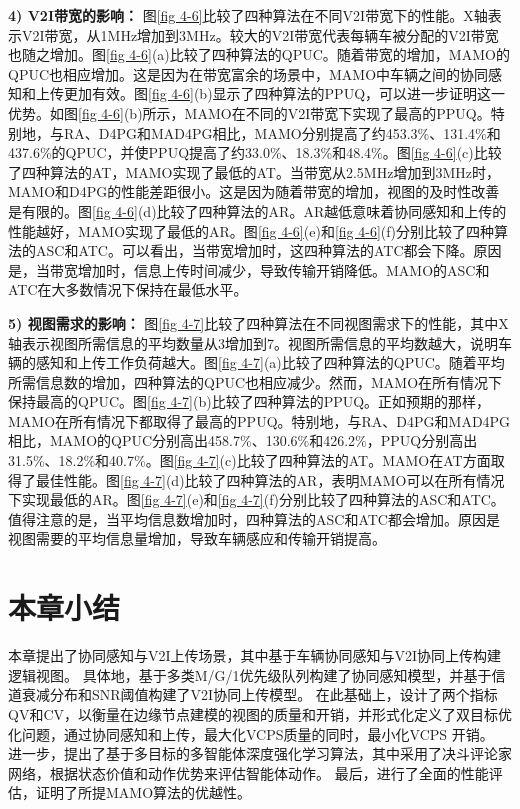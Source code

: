 \textbf{4) V2I带宽的影响：}
图\ref{fig 4-6}比较了四种算法在不同V2I带宽下的性能。X轴表示V2I带宽，从1MHz增加到3MHz。较大的V2I带宽代表每辆车被分配的V2I带宽也随之增加。图\ref{fig 4-6}(a)比较了四种算法的QPUC。随着带宽的增加，MAMO的QPUC也相应增加。这是因为在带宽富余的场景中，MAMO中车辆之间的协同感知和上传更加有效。图\ref{fig 4-6}(b)显示了四种算法的PPUQ，可以进一步证明这一优势。如图\ref{fig 4-6}(b)所示，MAMO在不同的V2I带宽下实现了最高的PPUQ。特别地，与RA、D4PG和MAD4PG相比，MAMO分别提高了约453.3\%、131.4\%和437.6\%的QPUC，并使PPUQ提高了约33.0\%、18.3\%和48.4\%。图\ref{fig 4-6}(c)比较了四种算法的AT，MAMO实现了最低的AT。当带宽从2.5MHz增加到3MHz时，MAMO和D4PG的性能差距很小。这是因为随着带宽的增加，视图的及时性改善是有限的。图\ref{fig 4-6}(d)比较了四种算法的AR。AR越低意味着协同感知和上传的性能越好，MAMO实现了最低的AR。图\ref{fig 4-6}(e)和\ref{fig 4-6}(f)分别比较了四种算法的ASC和ATC。可以看出，当带宽增加时，这四种算法的ATC都会下降。原因是，当带宽增加时，信息上传时间减少，导致传输开销降低。MAMO的ASC和ATC在大多数情况下保持在最低水平。

\textbf{5) 视图需求的影响：}
图\ref{fig 4-7}比较了四种算法在不同视图需求下的性能，其中X轴表示视图所需信息的平均数量从3增加到7。视图所需信息的平均数越大，说明车辆的感知和上传工作负荷越大。图\ref{fig 4-7}(a)比较了四种算法的QPUC。随着平均所需信息数的增加，四种算法的QPUC也相应减少。然而，MAMO在所有情况下保持最高的QPUC。图\ref{fig 4-7}(b)比较了四种算法的PPUQ。正如预期的那样，MAMO在所有情况下都取得了最高的PPUQ。特别地，与RA、D4PG和MAD4PG相比，MAMO的QPUC分别高出458.7\%、130.6\%和426.2\%，PPUQ分别高出31.5\%、18.2\%和40.7\%。图\ref{fig 4-7}(c)比较了四种算法的AT。MAMO在AT方面取得了最佳性能。图\ref{fig 4-7}(d)比较了四种算法的AR，表明MAMO可以在所有情况下实现最低的AR。图\ref{fig 4-7}(e)和\ref{fig 4-7}(f)分别比较了四种算法的ASC和ATC。值得注意的是，当平均信息数增加时，四种算法的ASC和ATC都会增加。原因是视图需要的平均信息量增加，导致车辆感应和传输开销提高。

\section[\hspace{-2pt}本章小结]{{ \hspace{-8pt}本章小结}}\label{section 4-7}

本章提出了协同感知与V2I上传场景，其中基于车辆协同感知与V2I协同上传构建逻辑视图。
具体地，基于多类M/G/1优先级队列构建了协同感知模型，并基于信道衰减分布和SNR阈值构建了V2I协同上传模型。
在此基础上，设计了两个指标QV和CV，以衡量在边缘节点建模的视图的质量和开销，并形式化定义了双目标优化问题，通过协同感知和上传，最大化VCPS质量的同时，最小化VCPS 开销。
进一步，提出了基于多目标的多智能体深度强化学习算法，其中采用了决斗评论家网络，根据状态价值和动作优势来评估智能体动作。
最后，进行了全面的性能评估，证明了所提MAMO算法的优越性。
